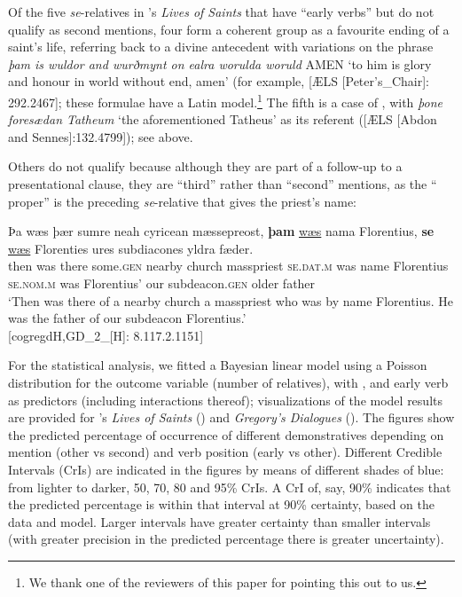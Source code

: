 \documentclass[output=paper,colorlinks,citecolor=brown]{langscibook}
\begin{document}
Of the five \textit{se}{}-relatives in 's \textit{Lives of Saints} that have “early verbs” but do not qualify as second mentions, four form a coherent group as a favourite ending of a saint's life, referring back to a divine antecedent with variations on the phrase \textit{þam is wuldor and wurðmynt on ealra worulda woruld} AMEN ‘to him is glory and honour in world without end, amen' (for example, [ÆLS [Peter's\_Chair]: 292.2467]; these formulae have a Latin model.\footnote{We thank one of the reviewers of this paper for pointing this out to us.} The fifth is a case of , with \textit{þone foresædan Tatheum} ‘the aforementioned Tatheus' as its referent ([ÆLS [Abdon and Sennes]:132.4799]); see  above.

Others do not qualify because although they are part of a follow-up to a presentational clause, they are “third” rather than “second” mentions, as the “ proper” is the preceding \textit{se}{}-relative that gives the priest's name:

 \ea\label{ex:los:26}
  \gll Þa wæs þær sumre neah cyricean mæssepreost, \textbf{þam} \underline{wæs} nama Florentius, \textbf{se} \underline{wæs} Florenties ures subdiacones yldra fæder.\\
then was there some.\textsc{gen} nearby church masspriest \textsc{se.dat.m} was name Florentius \textsc{se.nom.m} was Florentius' our subdeacon.\textsc{gen} older father\\
\glt ‘Then was there of a nearby church a masspriest who was by name Florentius. He was the father of our subdeacon Florentius.'\\ \hfill [cogregdH,GD\_2\_[H]: 8.117.2.1151]
\z

For the statistical analysis, we fitted a Bayesian linear model using a Poisson distribution for the outcome variable (number of relatives), with ,  and early verb as predictors (including interactions thereof); visualizations of the model results are provided for 's \textit{Lives of Saints} () and \textit{Gregory's Dialogues} (). The figures show the predicted percentage of occurrence of different demonstratives depending on mention (other vs second) and verb position (early vs other). Different Credible Intervals (CrIs) are indicated in the figures by means of different shades of blue: from lighter to darker, 50, 70, 80 and 95\% CrIs. A CrI of, say, 90\% indicates that the predicted percentage is within that interval at 90\% certainty, based on the data and model. Larger intervals have greater certainty than smaller intervals (with greater precision in the predicted percentage there is greater uncertainty). 
\end{document}
